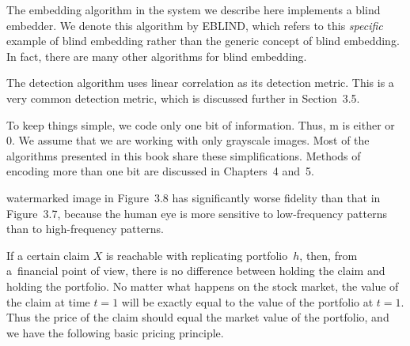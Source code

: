 \documentclass{Base}
\begin{document}
\begin{mibox}

\brule

\cbstart

\vspace*{3pt}


\vspace*{-5.5pt}

The embedding algorithm in the system we describe here implements
a blind embedder. We denote this algorithm by EBLIND, which refers
to this {\textit{specific}} example of blind embedding rather than
the generic concept of blind embedding. In fact, there are many
other algorithms for blind embedding.

\boxindent The detection algorithm uses linear correlation as its
detection metric. This is a very common detection metric, which is
discussed further in Section~3.5.

\boxindent To keep things simple, we code only one bit of
information. Thus, {m} is either or 0. We assume that we
are working with only grayscale images. Most of the algorithms
presented in this book share these simplifications. Methods of
encoding more than one bit are discussed in Chapters~4 and~5.

\vspace*{12pt} \setcounter{figure}{9}

\centerline{}
\vspace*{8pt}

watermarked image in Figure~3.8 has significantly worse fidelity
than that in Figure~3.7, because the human eye is more sensitive
to low-frequency patterns than to high-frequency patterns.

If a certain claim $X$ is reachable with replicating
portfolio~$h$, then, from a~financial point of view, there is no
difference between holding the claim and holding the portfolio. No
matter what happens on the stock market, the value of the claim at
time $t=1$ will be exactly equal to the value of the portfolio at
$t=1$. Thus the price of the claim should equal the market value
of the portfolio, and we have the following basic pricing
principle.


\end{mibox}
\end{document}
